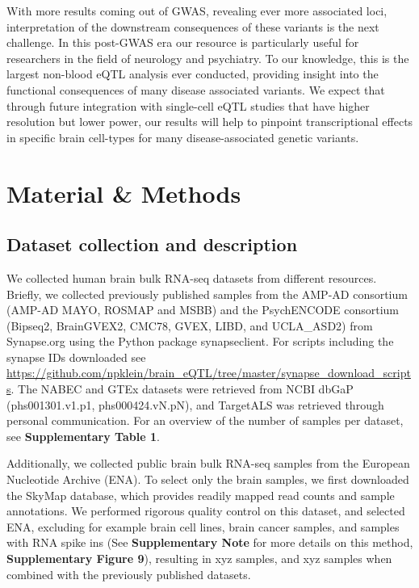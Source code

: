 With more results coming out of GWAS, revealing ever more associated loci, interpretation of the downstream consequences of these variants is the next challenge. In this post-GWAS era our resource is particularly useful for researchers in the field of neurology and psychiatry. To our knowledge, this is the largest non-blood eQTL analysis ever conducted, providing insight into the functional consequences of many disease associated variants. We expect that through future integration with single-cell eQTL studies that have higher resolution but lower power, our results will help to pinpoint transcriptional effects in specific brain cell-types for many disease-associated genetic variants. 

\section{Material \& Methods}
\subsection{Dataset collection and description }
We collected human brain bulk RNA-seq datasets from different resources. Briefly, we collected previously published samples from the AMP-AD consortium (AMP-AD MAYO\cite{hodesAcceleratingMedicinesPartnership2016}, ROSMAP\cite{hodesAcceleratingMedicinesPartnership2016} and MSBB\cite{hodesAcceleratingMedicinesPartnership2016}) and the PsychENCODE consortium (Bipseq2, BrainGVEX2, CMC78, GVEX, LIBD, and UCLA\_ASD2) from Synapse.org using the Python package synapseclient\cite{teamSynapseclientClientSynapse}. For scripts including the synapse IDs downloaded see \url{https://github.com/npklein/brain\_eQTL/tree/master/synapse\_download\_scripts}. The NABEC and GTEx datasets were retrieved from NCBI dbGaP (phs001301.v1.p1, phs000424.vN.pN), and TargetALS was retrieved through personal communication. For an overview of the number of samples per dataset, see \textbf{Supplementary Table 1}. 

Additionally, we collected public brain bulk RNA-seq samples from the European Nucleotide Archive (ENA). To select only the brain samples, we first downloaded the SkyMap database\cite{tsuiExtractingAllelicRead2018}, which provides readily mapped read counts and sample annotations. We performed rigorous quality control on this dataset, and selected ENA, excluding for example brain cell lines, brain cancer samples, and samples with RNA spike ins (See \textbf{Supplementary Note} for more details on this method, \textbf{Supplementary Figure 9}), resulting in xyz samples, and xyz samples when combined with the previously published datasets. 

